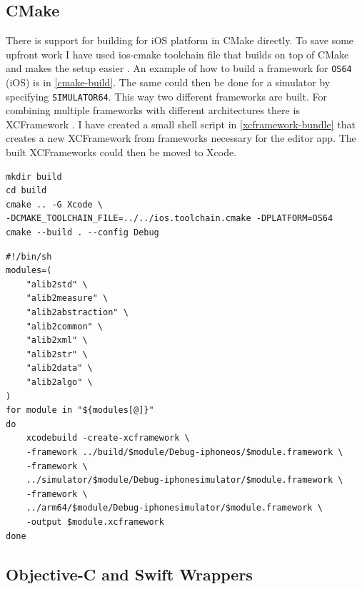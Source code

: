 \subsection{CMake}

There is support for building for iOS platform in CMake directly. To save some upfront work I have used ios-cmake toolchain file that builds on top of CMake and makes the setup easier \cite{ios-cmake}. An example of how to build a framework for \lstinline{OS64} (iOS) is in \ref{cmake-build}. The same could then be done for a simulator by specifying \lstinline{SIMULATOR64}. This way two different frameworks are built. For combining multiple frameworks with different architectures there is XCFramework \cite{xcframework}. I have created a small shell script in \ref{xcframework-bundle} that creates a new XCFramework from frameworks necessary for the editor app. The built XCFrameworks could then be moved to Xcode.

\begin{lstlisting}[caption=CMake build instructions, label=cmake-build]
mkdir build
cd build
cmake .. -G Xcode \
-DCMAKE_TOOLCHAIN_FILE=../../ios.toolchain.cmake -DPLATFORM=OS64
cmake --build . --config Debug
\end{lstlisting}

\begin{lstlisting}[caption=XCFramework shell script, label=xcframework-bundle]
#!/bin/sh
modules=(
    "alib2std" \
    "alib2measure" \
    "alib2abstraction" \
    "alib2common" \
    "alib2xml" \
    "alib2str" \
    "alib2data" \
    "alib2algo" \
)
for module in "${modules[@]}"
do
    xcodebuild -create-xcframework \
    -framework ../build/$module/Debug-iphoneos/$module.framework \
    -framework \
    ../simulator/$module/Debug-iphonesimulator/$module.framework \
    -framework \
    ../arm64/$module/Debug-iphonesimulator/$module.framework \
    -output $module.xcframework
done
\end{lstlisting}

\subsection{Objective-C and Swift Wrappers}

